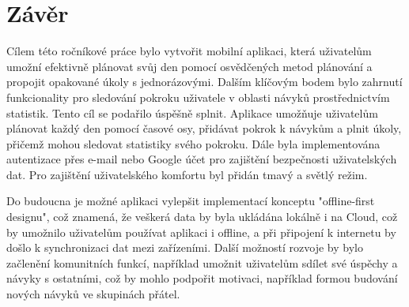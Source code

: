 \thispagestyle{empty}
\section*{Závěr}
\hspace{14pt} Cílem této ročníkové práce bylo vytvořit mobilní aplikaci, která uživatelům umožní efektivně plánovat svůj den pomocí osvědčených metod plánování a propojit opakované úkoly s jednorázovými. Dalším klíčovým bodem bylo zahrnutí funkcionality pro sledování pokroku uživatele v oblasti návyků prostřednictvím statistik. Tento cíl se podařilo úspěšně splnit. Aplikace umožňuje uživatelům plánovat každý den pomocí časové osy, přidávat pokrok k návykům a plnit úkoly, přičemž mohou sledovat statistiky svého pokroku. Dále byla implementována autentizace přes e-mail nebo Google účet pro zajištění bezpečnosti uživatelských dat. Pro zajištění uživatelského komfortu byl přidán tmavý a světlý režim. 

Do budoucna je možné aplikaci vylepšit implementací konceptu "offline-first designu", což znamená, že veškerá data by byla ukládána lokálně i na Cloud, což by umožnilo uživatelům používat aplikaci i offline, a při připojení k internetu by došlo k synchronizaci dat mezi zařízeními. Další možností rozvoje by bylo začlenění komunitních funkcí, například umožnit uživatelům sdílet své úspěchy a návyky s ostatními, což by mohlo podpořit motivaci, například formou budování nových návyků ve skupinách přátel.